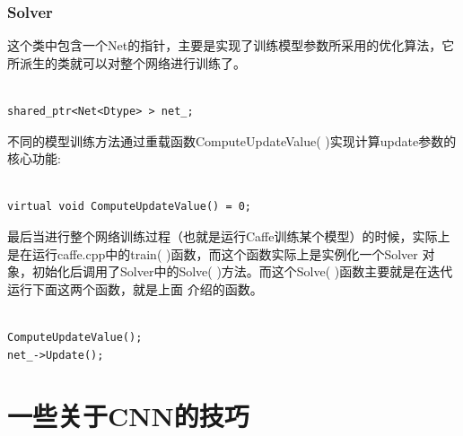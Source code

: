 \documentclass[11pt,fleqn, UTF8]{ctexbook} %
\begin{document}
\subsubsection{Solver}
这个类中包含一个Net的指针，主要是实现了训练模型参数所采用的优化算法，它所派生的类就可以对整个网络进行训练了。
\lstset{language=C++}
\begin{lstlisting}[frame=single]  % Start your code-block

shared_ptr<Net<Dtype> > net_;

\end{lstlisting}

不同的模型训练方法通过重载函数ComputeUpdateValue( )实现计算update参数的核心功能:
\lstset{language=C++}
\begin{lstlisting}[frame=single]  % Start your code-block

virtual void ComputeUpdateValue() = 0;

\end{lstlisting}

最后当进行整个网络训练过程（也就是运行Caffe训练某个模型）的时候，实际上是在运行caffe.cpp中的train( )函数，而这个函数实际上是实例化一个Solver 对象，初始化后调用了Solver中的Solve( )方法。而这个Solve( )函数主要就是在迭代运行下面这两个函数，就是上面 介绍的函数。
\lstset{language=C++}
\begin{lstlisting}[frame=single]  % Start your code-block

ComputeUpdateValue();
net_->Update();

\end{lstlisting}
\section{一些关于CNN的技巧}
\end{document}
